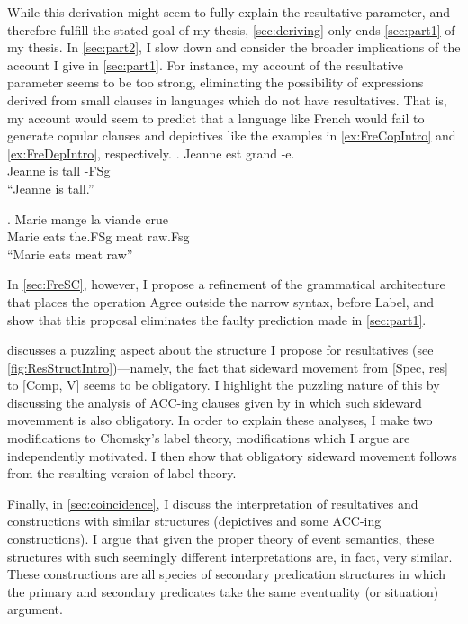 \documentclass[MilwayThesis]{subfiles}
\begin{document}
While this derivation might seem to fully explain the resultative parameter, and therefore fulfill the stated goal of my thesis, \cref{sec:deriving} only ends \cref{sec:part1} of my thesis.
In \cref{sec:part2}, I slow down and consider the broader implications of the account I give in \cref{sec:part1}.
For instance, my account of the resultative parameter seems to be too strong, eliminating the possibility of expressions derived from small clauses in languages which do not have resultatives.
That is, my account would seem to predict that a language like French would fail to generate copular clauses and depictives like the examples in \cref{ex:FreCopIntro} and \cref{ex:FreDepIntro}, respectively.
\exg. \label{ex:FreCopIntro}Jeanne est grand -e.\\
Jeanne is tall -FSg\\
``Jeanne is tall.''

\exg. \label{ex:FreDepIntro}Marie mange la viande crue\\
Marie eats the.FSg meat raw.Fsg\\
``Marie eats meat raw''

In \cref{sec:FreSC}, however, I propose a refinement of the grammatical architecture that places the operation Agree outside the narrow syntax, before Label, and show that this proposal eliminates the faulty prediction made in \cref{sec:part1}.

 discusses a puzzling aspect about the structure I propose for resultatives (see \cref{fig:ResStructIntro})---namely, the fact that sideward movement from [Spec, res] to [Comp, V] seems to be obligatory.
I highlight the puzzling nature of this by discussing the analysis of ACC-ing clauses given by \textcite{cinque1996pseudo} in which such sideward movemment is also obligatory.
In order to explain these analyses, I make two modifications to Chomsky's label theory, modifications which I argue are independently motivated.
I then show that obligatory sideward movement follows from the resulting version of label theory.

Finally, in \cref{sec:coincidence}, I discuss the interpretation of resultatives and constructions with similar structures (depictives and some ACC-ing constructions).
I argue that given the proper theory of event semantics, these structures with such seemingly different interpretations are, in fact, very similar.
These constructions are all species of secondary predication structures in which the primary and secondary predicates take the same eventuality (or situation) argument.
\end{document}
